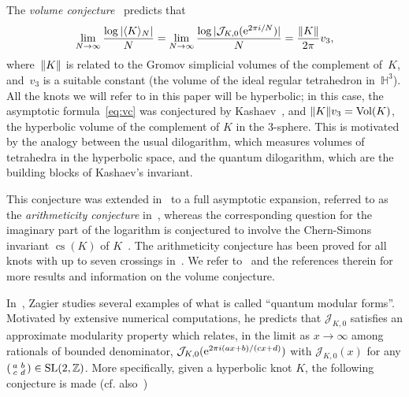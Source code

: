 \documentclass[11pt]{amsart}
\newcommand{\Z}{\mathbb{Z}}
\newcommand{\ang}[1]{\langle#1\rangle}
\newcommand{\J}{\mathcal{J}}
\newcommand{\tn}[1]{\textnormal{#1}}
\theoremstyle{definition}
\newcommand{\pr}[1]{\mathchoice{\left( #1\right)}{(#1)}{(#1)}{(#1)}}
\newcommand{\e}[1][]{\ifthenelse{\equal{#1}{}}{{\rm e}}{\operatorname{e}\pr{ #1}}}
\DeclareMathOperator{\cs}{cs}
\newcommand{\1}{{\mathbf 1}}
\newcommand{\norm}[1]{\left\|#1\right\|}
\newcommand{\SL}{\tn{SL}}
\let\originalleft\left
\let\originalright\right
\renewcommand{\left}{\mathopen{}\mathclose\bgroup\originalleft}
\renewcommand{\right}{\aftergroup\egroup\originalright}
\numberwithin{equation}{section}
\begin{document}
The \emph{volume conjecture}~\cite[Section~5]{MurakamiMurakami2001} predicts that 
\begin{equation}\label{eq:vc}
  \lim_{N\to\infty}\frac{\log |\ang{K}_N|}{N}=\lim_{N\to\infty}\frac{\log |\J_{K,0}(\e^{2\pi i /N})|}{N}=\frac{\norm{K}}{2\pi} v_3,
\end{equation}
where~$\norm{K}$ is related to the Gromov simplicial volumes of the complement of~$K$, and~$v_3$ is a suitable constant (the volume of the ideal regular tetrahedron in~${\mathbb H}^3$).
All the knots we will refer to in this paper will be hyperbolic; in this case, the asymptotic formula~\eqref{eq:vc} was conjectured by Kashaev~\cite{Kashaev1997}, and $\norm{K}v_3 = \tn{Vol} (K)$, the hyperbolic volume of the complement of $K$ in the $3$-sphere.
This is motivated by the analogy between the usual dilogarithm, which measures volumes of tetrahedra in the hyperbolic space, and the quantum dilogarithm, which are the building blocks of Kashaev's invariant.

This conjecture was extended in~\cite{Gukov2005} to a full asymptotic expansion, referred to as the \emph{arithmeticity conjecture} in~\cite{CalegariGaroufalidisZagier}, whereas the corresponding question for the imaginary part of the logarithm is conjectured to involve the Chern-Simons invariant $\cs (K)$ of $K$~\cite{MurakamiMurakamiEtAl2002, Gukov2005}. The arithmeticity conjecture has been proved for all knots with up to seven crossings in~\cite{AndersenHansen2006,Ohtsuki52,OhtsukiYokota6,Ohtsuki7}. We refer to~\cite{DimofteGukovEtAl2009,Murakami2017,MurakamiYokota2018,Murakami2011,KashaevTirkkonen}
and the references therein for more results and information on the volume conjecture.

In~\cite{Zagier2010}, Zagier studies several examples of what is called ``quantum modular forms''. Motivated by extensive numerical computations, he predicts that $\J_{K,0}$ satisfies an approximate modularity property which relates, in the limit as $x\to\infty$ among rationals of bounded denominator, $\J_{K,0}(\e^{2\pi i ({ax+b})/({cx+d})})$ with $\J_{K,0}(x)$ for any $(\begin{smallmatrix}a &b \\ c& d\end{smallmatrix})\in\SL(2,\Z)$. More specifically, given a hyperbolic knot $K$, the following conjecture is made (cf. also~\cite{Garoufalidis2018})
\end{document}
